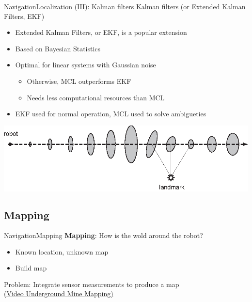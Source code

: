 \documentclass[10pt,compress]{beamer} %
\begin{document}
\begin{frame}{Navigation}{Localization (III): Kalman filters}
	Kalman filters (or Extended Kalman Filters, EKF)
	\begin{itemize}
		\item Extended Kalman Filters, or EKF, is a popular extension
		\item Based on Bayesian Statistics
		\item Optimal for linear systems with Gaussian noise
			\begin{itemize}
			\item Otherwise, MCL outperforms EKF
			\item Needs less computational resources than MCL
			\end{itemize}
		\item EKF used for normal operation, MCL used to solve ambigueties
	\end{itemize}
	\bigskip
	\begin{center} \includegraphics[width=0.7\linewidth]{figs/robotics-pic6.eps}
	\end{center}
\end{frame}

\subsection{Mapping}

\begin{frame}{Navigation}{Mapping}
	\textbf{Mapping}: How is the wold around the robot?
	\begin{itemize}
		\item Known location, unknown map
		\item Build map
	\end{itemize}
	Problem: Integrate sensor measurements to produce a map\\
	\href{https://www.youtube.com/watch?v=8HdgliagAds}{(Video Underground Mine Mapping)}
\end{frame}
\end{document}
